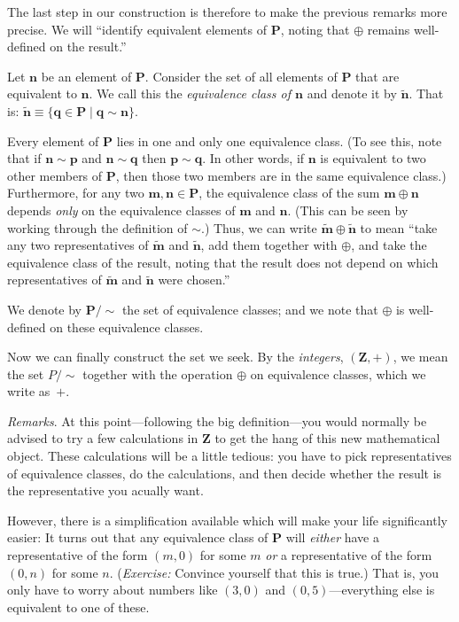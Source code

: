 \documentclass[10pt, a4paper, twocolumn]{article}
\newcommand{\set}[1]{\mathbold{#1}}
\newcommand{\pairs}{\set{P}}
\begin{document}
The last step in our construction is therefore to make the previous
remarks more precise. We will ``identify equivalent elements of
$\pairs$, noting that $\oplus$ remains well-defined on the result.'' 

Let $\mathbold{n}$ be an element of $\pairs$. Consider the set of all
elements of $\pairs$ that are equivalent to $\mathbold{n}$. We call
this the \emph{equivalence class of $\mathbold{n}$} and denote it by
$\tilde{\mathbold{n}}$. That is: $\tilde{\mathbold{n}} \equiv \{
\mathbold{q}\in\pairs \mid \mathbold{q}\sim\mathbold{n}\}$.

Every element of $\pairs$ lies in one and only one equivalence
class. (To see this, note that if $\mathbold{n}\sim\mathbold{p}$ and
$\mathbold{n}\sim\mathbold{q}$ then $\mathbold{p}\sim\mathbold{q}$. In other
words, if $\mathbold{n}$ is equivalent to two other members of
$\pairs$, then those two members are in the same equivalence class.)
Furthermore, for any two $\mathbold{m},\mathbold{n}\in\pairs$, the
equivalence class of the sum $\mathbold{m}\oplus\mathbold{n}$ depends
\emph{only} on the equivalence classes of $\mathbold{m}$ and
$\mathbold{n}$. (This can be seen by working through the definition of
$\sim$.) Thus, we can write $\tilde{\mathbold{m}}\oplus\tilde{\mathbold{n}}$
to mean ``take any two representatives of $\tilde{\mathbold{m}}$ and
$\tilde{\mathbold{n}}$, add them together with $\oplus$, and take the
equivalence class of the result, noting that the result does not
depend on which representatives of $\tilde{\mathbold{m}}$ and
$\tilde{\mathbold{n}}$ were chosen.''

We denote by $\pairs/{\sim}$ the set of equivalence classes; and we note
that $\oplus$ is well-defined on these equivalence classes.

Now we can finally construct the set we seek. By the \emph{integers},
$(\set{Z}, +)$, we mean the set $P/{\sim}$ together with the operation
$\oplus$ on equivalence classes, which we write as~$+$.

\emph{Remarks}. At this point---following the big definition---you would
normally be advised to try a few calculations in $\set{Z}$ to get the
hang of this new mathematical object. These calculations will be a
little tedious: you have to pick representatives of equivalence
classes, do the calculations, and then decide whether the result is
the representative you acually want.

However, there is a simplification available which will make your life
significantly easier: It turns out that any equivalence class of
$\pairs$ will \emph{either} have a representative of the form $(m, 0)$
for some $m$ \emph{or} a representative of the form $(0, n)$ for some
$n$. (\emph{Exercise:} Convince yourself that this is true.) That is,
you only have to worry about numbers like $(3,0)$ and
$(0,5)$---everything else is equivalent to one of these.
\end{document}
